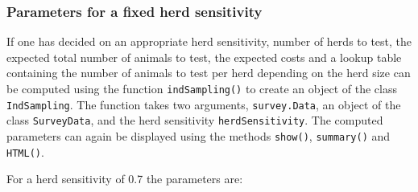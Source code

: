 \documentclass[nojss]{jss}
\begin{document}
\subsubsection{Parameters for a fixed herd sensitivity}

If one has decided on an appropriate herd sensitivity, number of herds to test, the expected total number of animals to test, the expected costs and a lookup table containing the number of animals to test per herd depending on the herd size can be computed using the function \texttt{indSampling()}  to create an object of the class \texttt{IndSampling}.   The function takes two arguments, \texttt{survey.Data}, an object of the class \texttt{SurveyData}, and the herd sensitivity \texttt{herdSensitivity}. The computed parameters can again be displayed using the methods \texttt{show()}, \texttt{summary()} and \texttt{HTML()}.   

For a herd sensitivity of 0.7 the parameters are:
\end{document}
